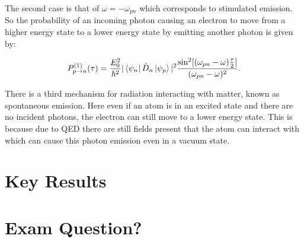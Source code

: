\noindent The second case is that of $\omega = -\omega_{pn}$ which corresponds to stimulated emission. So the probability of an incoming photon causing an electron to move from a higher energy state to a lower energy state by emitting another photon is given by:

\begin{equation}
    P^{(1)}_{p\rightarrow n}(\tau) = \frac{E_0^2}{\hbar^2} |\bra{\psi_n} \Hat{D}_n \ket{\psi_p}|^2 \frac{\sin^2[(\omega_{pn} - \omega)\frac{\tau}{2}]}{(\omega_{pn} - \omega)^2}.
    \label{StimulatedEmission}
\end{equation}

\noindent There is a third mechanism for radiation interacting with matter, known as spontaneous emission. Here even if an atom is in an excited state and there are no incident photons, the electron can still move to a lower energy state. This is because due to QED there are still fields present that the atom can interact with which can cause this photon emission even in a vacuum state.

\section{Key Results}

\section{Exam Question?}


